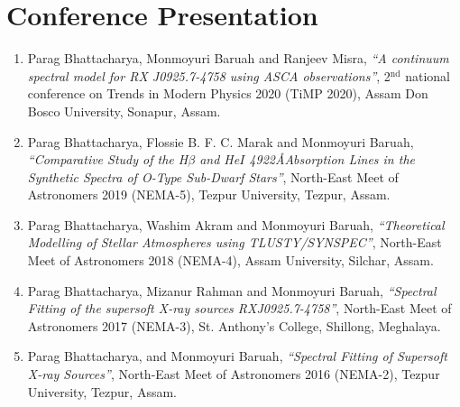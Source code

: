     \section{Conference Presentation}
        \begin{enumerate}
            \item Parag Bhattacharya, Monmoyuri Baruah and Ranjeev Misra, \textit{``A continuum spectral model for RX J0925.7-4758 using ASCA observations''}, 2$^{\text{nd}}$ national conference on Trends in Modern Physics 2020 (TiMP 2020), Assam Don Bosco University, Sonapur, Assam.
            
            \item Parag Bhattacharya, Flossie B. F. C. Marak and Monmoyuri Baruah, \textit{``Comparative Study of the H$\beta$ and He$I$ 4922\AA Absorption Lines in the Synthetic Spectra of O-Type Sub-Dwarf Stars''}, North-East Meet of Astronomers 2019 (NEMA-5), Tezpur University, Tezpur, Assam.
            
            \item Parag Bhattacharya, Washim Akram and Monmoyuri Baruah, \textit{``Theoretical Modelling of Stellar Atmospheres using TLUSTY/SYNSPEC''}, North-East Meet of Astronomers 2018 (NEMA-4), Assam University, Silchar, Assam.
            
            \item Parag Bhattacharya, Mizanur Rahman and Monmoyuri Baruah, \textit{``Spectral Fitting of the supersoft X-ray sources RXJ0925.7-4758''}, North-East Meet of Astronomers 2017 (NEMA-3), St. Anthony's College, Shillong, Meghalaya.
            
            \item Parag Bhattacharya, and Monmoyuri Baruah, \textit{``Spectral Fitting of Supersoft X-ray Sources''}, North-East Meet of Astronomers 2016 (NEMA-2), Tezpur University, Tezpur, Assam.
        \end{enumerate}